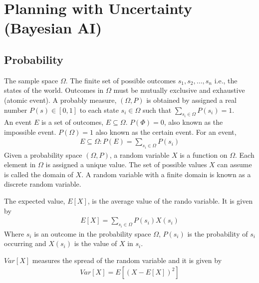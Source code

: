 \documentclass[a4paper]{article}
\theoremstyle{plain}
\theoremstyle{definition}
\newtheorem{defn}{Definition}[section]
\theoremstyle{remark}
\begin{document}
	\section{Planning with Uncertainty (Bayesian AI)}
\subsection{Probability}
The sample space $\Omega$. The finite set of possible outcomes $s_1,s_2,\ldots,s_n$ i.e., the states of the world. Outcomes in $\Omega$ must be mutually exclusive and exhaustive (atomic event). A probably measure, $(\Omega,P)$ is obtained by assigned a real number $P(s) \in [0,1]$ to each state $s_i \in \Omega$ such that $\sum_{s_i \in \Omega}^{} P(s_i)=1$. \\
An event $E$ is a set of outcomes, $E \subseteq \Omega$. $P(\Phi) = 0$, also known as the impossible event. $P(\Omega) = 1$ also known as the certain event. For an event,
\begin{align*}
	E \subseteq \Omega : P(E) = \sum_{s_i \in \Omega}^{} P(s_i)
\end{align*}
Given a probability space $(\Omega,P)$, a random variable $X$ is a function on $\Omega$. Each element in $\Omega$ is assigned a unique value. The set of possible values $X$ can assume is called the domain of $X$. A random variable with a finite domain is known as a discrete random variable.
\begin{tcolorbox}[colback=black!3!white,colframe=black!60!white,title=\begin{defn}Expected Value \label{Expected Value}\end{defn}]
The expected value, $E[X]$, is the average value of the rando variable. It is given by
\begin{align*}
	E[X] = \sum_{s_i \in \Omega}^{} P(s_i)X(s_i)
\end{align*}
Where $s_i$ is an outcome in the probability space $\Omega$, $P(s_i)$ is the probability of $s_i$ occurring and $X(s_i)$ is the value of $X$ in $s_i$.
\end{tcolorbox}
\begin{tcolorbox}[colback=black!3!white,colframe=black!60!white,title=\begin{defn}Variance \label{Variance}\end{defn}]
$Var[X]$ measures the spread of the random variable and it is given by
\begin{align}
Var[X] = E[(X-E[X])^2]
\end{align}
\end{tcolorbox}
\end{document}
